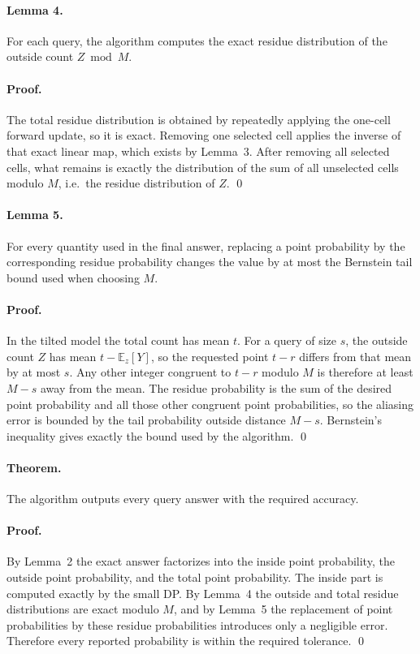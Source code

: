 \documentclass[11pt]{article}
\begin{document}
\paragraph{Lemma 4.}
For each query, the algorithm computes the exact residue distribution of the outside count $Z \bmod M$.

\paragraph{Proof.}
The total residue distribution is obtained by repeatedly applying the one-cell forward update, so it is exact.
Removing one selected cell applies the inverse of that exact linear map, which exists by Lemma~3.
After removing all selected cells, what remains is exactly the distribution of the sum of all unselected cells modulo
$M$, i.e.\ the residue distribution of $Z$. \qed

\paragraph{Lemma 5.}
For every quantity used in the final answer, replacing a point probability by the corresponding residue probability
changes the value by at most the Bernstein tail bound used when choosing $M$.

\paragraph{Proof.}
In the tilted model the total count has mean $t$.
For a query of size $s$, the outside count $Z$ has mean $t-\mathbb E_z[Y]$, so the requested point $t-r$ differs from
that mean by at most $s$.
Any other integer congruent to $t-r$ modulo $M$ is therefore at least $M-s$ away from the mean.
The residue probability is the sum of the desired point probability and all those other congruent point probabilities,
so the aliasing error is bounded by the tail probability outside distance $M-s$.
Bernstein's inequality gives exactly the bound used by the algorithm. \qed

\paragraph{Theorem.}
The algorithm outputs every query answer with the required accuracy.

\paragraph{Proof.}
By Lemma~2 the exact answer factorizes into the inside point probability, the outside point probability, and the total
point probability.
The inside part is computed exactly by the small DP.
By Lemma~4 the outside and total residue distributions are exact modulo $M$, and by Lemma~5 the replacement of point
probabilities by these residue probabilities introduces only a negligible error.
Therefore every reported probability is within the required tolerance. \qed
\end{document}
